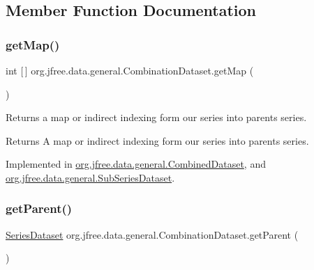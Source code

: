 \subsection{Member Function Documentation}
\mbox{\label{interfaceorg_1_1jfree_1_1data_1_1general_1_1_combination_dataset_a66aff831b2ae72a85d4485c56f8b0d21}} 
\subsubsection{\texorpdfstring{get\+Map()}{getMap()}}
{\footnotesize\ttfamily int \mbox{[}$\,$\mbox{]} org.\+jfree.\+data.\+general.\+Combination\+Dataset.\+get\+Map (\begin{DoxyParamCaption}{ }\end{DoxyParamCaption})}

Returns a map or indirect indexing form our series into parent\textquotesingle{}s series.

\begin{DoxyReturn}{Returns}
A map or indirect indexing form our series into parent\textquotesingle{}s series. 
\end{DoxyReturn}


Implemented in \mbox{\hyperlink{classorg_1_1jfree_1_1data_1_1general_1_1_combined_dataset_a4e31368adeb280dd35e158ee9505e89b}{org.\+jfree.\+data.\+general.\+Combined\+Dataset}}, and \mbox{\hyperlink{classorg_1_1jfree_1_1data_1_1general_1_1_sub_series_dataset_a20540010e04859741397e673b45e2efb}{org.\+jfree.\+data.\+general.\+Sub\+Series\+Dataset}}.

\mbox{\label{interfaceorg_1_1jfree_1_1data_1_1general_1_1_combination_dataset_aba6918d290f095187907982432506bfe}} 
\subsubsection{\texorpdfstring{get\+Parent()}{getParent()}}
{\footnotesize\ttfamily \mbox{\hyperlink{interfaceorg_1_1jfree_1_1data_1_1general_1_1_series_dataset}{Series\+Dataset}} org.\+jfree.\+data.\+general.\+Combination\+Dataset.\+get\+Parent (\begin{DoxyParamCaption}{ }\end{DoxyParamCaption})}

